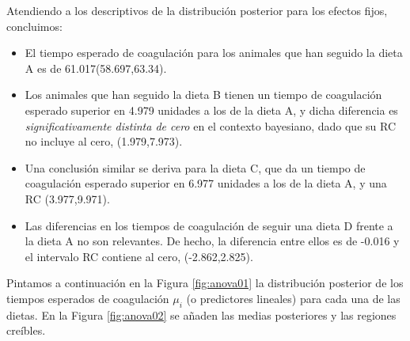 \documentclass[
]{book}
\providecommand{\tightlist}{%
  \setlength{\itemsep}{0pt}\setlength{\parskip}{0pt}}
\begin{document}
Atendiendo a los descriptivos de la distribución posterior para los efectos fijos, concluimos:

\begin{itemize}
\tightlist
\item
  El tiempo esperado de coagulación para los animales que han seguido la dieta A es de 61.017(58.697,63.34).
\item
  Los animales que han seguido la dieta B tienen un tiempo de coagulación esperado superior en 4.979 unidades a los de la dieta A, y dicha diferencia es \emph{significativamente distinta de cero} en el contexto bayesiano, dado que su RC no incluye al cero, (1.979,7.973).
\item
  Una conclusión similar se deriva para la dieta C, que da un tiempo de coagulación esperado superior en 6.977 unidades a los de la dieta A, y una RC (3.977,9.971).
\item
  Las diferencias en los tiempos de coagulación de seguir una dieta D frente a la dieta A no son relevantes. De hecho, la diferencia entre ellos es de -0.016 y el intervalo RC contiene al cero, (-2.862,2.825).
\end{itemize}

Pintamos a continuación en la Figura \ref{fig:anova01} la distribución posterior de los tiempos esperados de coagulación \(\mu_i\) (o predictores lineales) para cada una de las dietas. En la Figura \ref{fig:anova02} se añaden las medias posteriores y las regiones creíbles.
\end{document}
